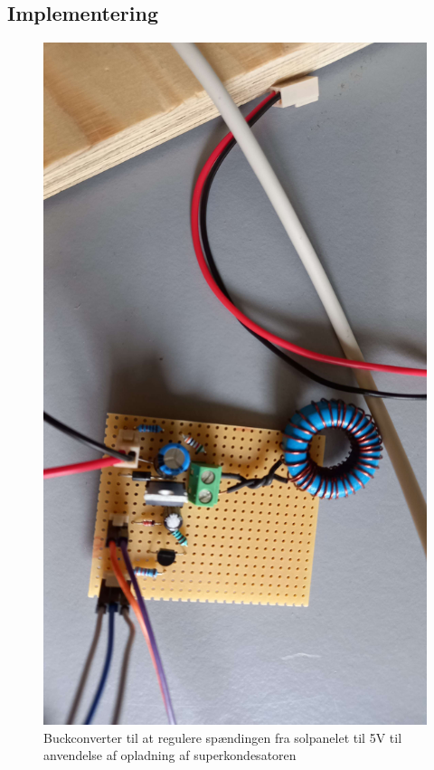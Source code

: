 \documentclass[../main.tex]{subfiles}
\begin{document}
    \subsection{Implementering}
        \begin{figure}[H]
        \includegraphics[scale = 0.1]{Dokumentation/Pictures/PV_udgangsbuck5V.jpg}
        \caption{Buckconverter til at regulere spændingen fra solpanelet til 5V til anvendelse af opladning af superkondesatoren}
        \label{pic: MPPTbuck}
        \end{figure}
\end{document}

